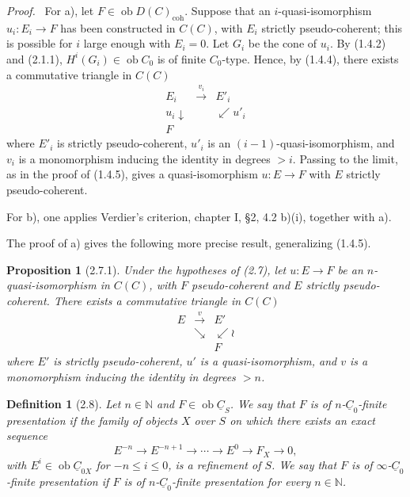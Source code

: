 \documentclass[13pt]{extarticle}
\newcommand{\NN}{\mathbb N}
\newcommand{\uC}{\underline C}
\newcommand{\ob}{\operatorname{ob}}
\newenvironment{prooftext}[1][Proof]{\par\noindent\emph{#1.}\ }{\par\medskip}
\newtheorem*{proposition*}{Proposition}
\newtheorem*{definition*}{Definition}
\begin{document}
\begin{prooftext}
For a), let $F\in\ob D(C)_{\mathrm{coh}}$. Suppose that an $i$-quasi-isomorphism $u_i:E_i\to F$ has been constructed in $C(C)$, with $E_i$ strictly pseudo-coherent; this is possible for $i$ large enough with $E_i=0$. Let $G_i$ be the cone of $u_i$. By (1.4.2) and (2.1.1), $H^i(G_i)\in\ob C_0$ is of finite $C_0$-type. Hence, by (1.4.4), there exists a commutative triangle in $C(C)$
\[
\begin{array}{ccc}
E_i&\xrightarrow{v_i}&E'_i\\
u_i\downarrow&&\swarrow u'_i\\
F&&
\end{array}
\]
where $E'_i$ is strictly pseudo-coherent, $u'_i$ is an $(i-1)$-quasi-isomorphism, and $v_i$ is a monomorphism inducing the identity in degrees $>i$. Passing to the limit, as in the proof of (1.4.5), gives a quasi-isomorphism $u:E\to F$ with $E$ strictly pseudo-coherent.

For b), one applies Verdier's criterion, chapter I, \S 2, 4.2 b)(i), together with a).
\end{prooftext}

The proof of a) gives the following more precise result, generalizing (1.4.5).

\begin{proposition*}[2.7.1]
Under the hypotheses of (2.7), let $u:E\to F$ be an $n$-quasi-isomorphism in $C(C)$, with $F$ pseudo-coherent and $E$ strictly pseudo-coherent. There exists a commutative triangle in $C(C)$
\[
\begin{array}{ccc}
E&\xrightarrow{v}&E'\\
&\searrow&\swarrow\wr\\
&&F
\end{array}
\]
where $E'$ is strictly pseudo-coherent, $u'$ is a quasi-isomorphism, and $v$ is a monomorphism inducing the identity in degrees $>n$.
\end{proposition*}

\begin{definition*}[2.8]
Let $n\in\NN$ and $F\in\ob\uC_S$. We say that $F$ is of \emph{$n$-$\uC_0$-finite presentation} if the family of objects $X$ over $S$ on which there exists an exact sequence
\[
E^{-n}\longrightarrow E^{-n+1}\longrightarrow\cdots\longrightarrow E^0\longrightarrow F_X\longrightarrow0,
\]
with $E^i\in\ob\uC_{0X}$ for $-n\leq i\leq0$, is a refinement of $S$. We say that $F$ is of \emph{$\infty$-$\uC_0$-finite presentation} if $F$ is of $n$-$\uC_0$-finite presentation for every $n\in\NN$.
\end{definition*}
\end{document}
